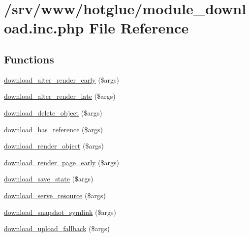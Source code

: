 \hypertarget{module__download_8inc_8php}{
\section{/srv/www/hotglue/module\_\-download.inc.php File Reference}
\label{module__download_8inc_8php}
}
\subsection*{Functions}
\begin{DoxyCompactItemize}
\item 
\hyperlink{module__download_8inc_8php_a28d1b9ae20de8d1a271f15d308b1df31}{download\_\-alter\_\-render\_\-early} (\$args)
\item 
\hyperlink{module__download_8inc_8php_a61a6050abc43cf71d0ca422a9240ae7c}{download\_\-alter\_\-render\_\-late} (\$args)
\item 
\hyperlink{module__download_8inc_8php_a5fd781bf1e0393667b227abec7169b28}{download\_\-delete\_\-object} (\$args)
\item 
\hyperlink{module__download_8inc_8php_aa80da3f3fd41f7f00f97043f7a2431c8}{download\_\-has\_\-reference} (\$args)
\item 
\hyperlink{module__download_8inc_8php_a57c588f1fd0663aa16fd707a522bcc79}{download\_\-render\_\-object} (\$args)
\item 
\hyperlink{module__download_8inc_8php_ac980246bec838c65efd59bc25253b005}{download\_\-render\_\-page\_\-early} (\$args)
\item 
\hyperlink{module__download_8inc_8php_a2e9ee6868b80832b40e9072a8c644c88}{download\_\-save\_\-state} (\$args)
\item 
\hyperlink{module__download_8inc_8php_a930c9545346e8da3f3db5a97dc4d8c74}{download\_\-serve\_\-resource} (\$args)
\item 
\hyperlink{module__download_8inc_8php_ae1b136740fb3c1fe26820e1982f8d353}{download\_\-snapshot\_\-symlink} (\$args)
\item 
\hyperlink{module__download_8inc_8php_a678bcaf9018d772881b4291020894fa0}{download\_\-upload\_\-fallback} (\$args)
\end{DoxyCompactItemize}


